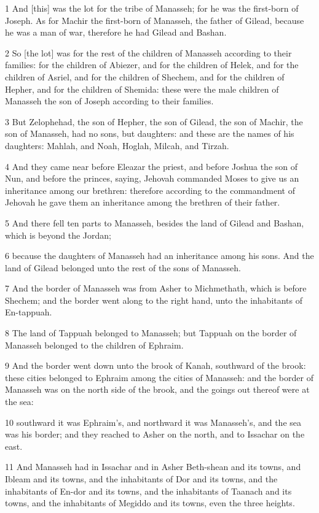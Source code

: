 \par 1 And [this] was the lot for the tribe of Manasseh; for he was the first-born of Joseph. As for Machir the first-born of Manasseh, the father of Gilead, because he was a man of war, therefore he had Gilead and Bashan.
\par 2 So [the lot] was for the rest of the children of Manasseh according to their families: for the children of Abiezer, and for the children of Helek, and for the children of Asriel, and for the children of Shechem, and for the children of Hepher, and for the children of Shemida: these were the male children of Manasseh the son of Joseph according to their families.
\par 3 But Zelophehad, the son of Hepher, the son of Gilead, the son of Machir, the son of Manasseh, had no sons, but daughters: and these are the names of his daughters: Mahlah, and Noah, Hoglah, Milcah, and Tirzah.
\par 4 And they came near before Eleazar the priest, and before Joshua the son of Nun, and before the princes, saying, Jehovah commanded Moses to give us an inheritance among our brethren: therefore according to the commandment of Jehovah he gave them an inheritance among the brethren of their father.
\par 5 And there fell ten parts to Manasseh, besides the land of Gilead and Bashan, which is beyond the Jordan;
\par 6 because the daughters of Manasseh had an inheritance among his sons. And the land of Gilead belonged unto the rest of the sons of Manasseh.
\par 7 And the border of Manasseh was from Asher to Michmethath, which is before Shechem; and the border went along to the right hand, unto the inhabitants of En-tappuah.
\par 8 The land of Tappuah belonged to Manasseh; but Tappuah on the border of Manasseh belonged to the children of Ephraim.
\par 9 And the border went down unto the brook of Kanah, southward of the brook: these cities belonged to Ephraim among the cities of Manasseh: and the border of Manasseh was on the north side of the brook, and the goings out thereof were at the sea:
\par 10 southward it was Ephraim's, and northward it was Manasseh's, and the sea was his border; and they reached to Asher on the north, and to Issachar on the east.
\par 11 And Manasseh had in Issachar and in Asher Beth-shean and its towns, and Ibleam and its towns, and the inhabitants of Dor and its towns, and the inhabitants of En-dor and its towns, and the inhabitants of Taanach and its towns, and the inhabitants of Megiddo and its towns, even the three heights.
